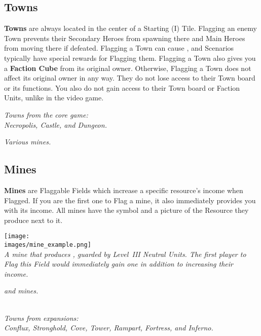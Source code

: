 \begin{multicols}{2}
\subsection*{Towns}
\textbf{Towns} are always located in the center of a Starting (I) Tile.
Flagging an enemy Town prevents their Secondary Heroes from spawning there and Main Heroes from moving there if defeated.
Flagging a Town can cause , and Scenarios typically have special rewards for Flagging them.
Flagging a Town also gives you a \textbf{Faction Cube} from its original owner.
Otherwise, Flagging a Town does not affect its original owner in any way.
They do not lose access to their Town board or its functions.
You also do not gain access to their Town board or Faction Units, unlike in the video game.

\begin{center}
  \textit{Towns from the core game:\\Necropolis, Castle, and Dungeon.}

  \vspace{3em}

  \vspace*{\fill}

  \textit{Various  mines.}
\end{center}

\columnbreak

\subsection*{Mines}
{\textbf{Mines}} are Flaggable Fields which increase a specific resource's income when Flagged.
If you are the first one to Flag a mine, it also immediately provides you with its income.
All mines have the  symbol and a picture of the Resource they produce next to it.

\begin{center}
  \texttt{[image: \\images/mine\_example.png]}\\
  \textit{A mine that produces , guarded by \mbox{Level III} Neutral Units.
    The first player to Flag this Field would immediately gain one  in addition to increasing their  income.
  }

  \vspace*{\fill}
  \textit{ and  mines.}
\end{center}


\end{multicols}
\begin{center}
\\
\textit{Towns from expansions:\\Conflux, Stronghold, Cove, Tower, Rampart, Fortress, and Inferno.}
\end{center}
\pagebreak

